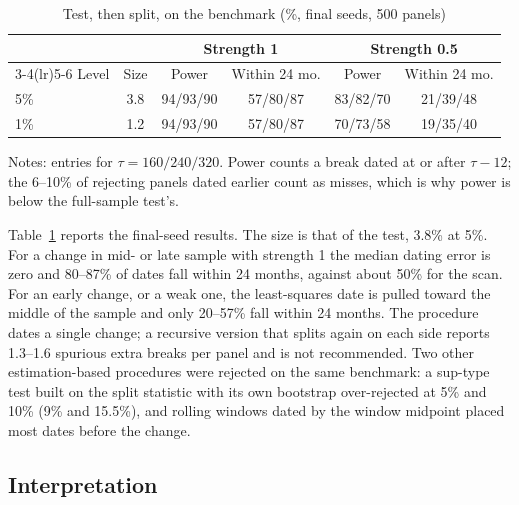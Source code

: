 \documentclass[11pt]{article}
\begin{document}
\begin{table}[htbp]
\centering
\begin{threeparttable}
\caption{Test, then split, on the benchmark (\%, final seeds, 500 panels)}\label{tab.split}
\begin{tabular}{lccccc}
\toprule
 & & \multicolumn{2}{c}{Strength 1} & \multicolumn{2}{c}{Strength 0.5}\\
\cmidrule(lr){3-4}\cmidrule(lr){5-6}
Level & Size & Power & Within 24 mo. & Power & Within 24 mo.\\
\midrule
5\% & 3.8 & 94/93/90 & 57/80/87 & 83/82/70 & 21/39/48\\
1\% & 1.2 & 94/93/90 & 57/80/87 & 70/73/58 & 19/35/40\\
\bottomrule
\end{tabular}
\begin{tablenotes}\small
\item Notes: entries for $\tau=160/240/320$. Power counts a break dated at or after $\tau-12$; the 6--10\% of rejecting panels dated earlier count as misses, which is why power is below the full-sample test's.
\end{tablenotes}
\end{threeparttable}
\end{table}

Table~\ref{tab.split} reports the final-seed results. The size is that of the test, 3.8\% at 5\%. For a change in mid- or late sample with strength 1 the median dating error is zero and 80--87\% of dates fall within 24 months, against about 50\% for the scan. For an early change, or a weak one, the least-squares date is pulled toward the middle of the sample and only 20--57\% fall within 24 months. The procedure dates a single change; a recursive version that splits again on each side reports 1.3--1.6 spurious extra breaks per panel and is not recommended. Two other estimation-based procedures were rejected on the same benchmark: a sup-type test built on the split statistic with its own bootstrap over-rejected at 5\% and 10\% (9\% and 15.5\%), and rolling windows dated by the window midpoint placed most dates before the change.

\subsection{Interpretation}
\end{document}
